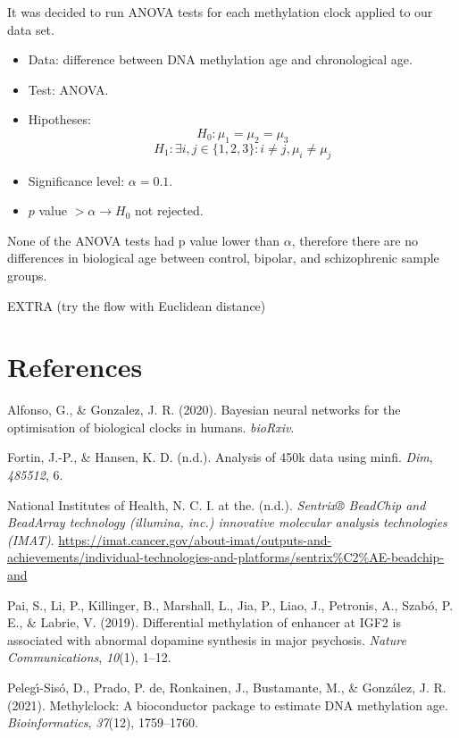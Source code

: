 \documentclass[
]{article}
\newlength{\cslhangindent}
\newlength{\cslentryspacingunit} %
\newenvironment{CSLReferences}[2] %
 {%
  \setlength{\parindent}{0pt}
  \ifodd #1
  \let\oldpar\par
  \def\par{\hangindent=\cslhangindent\oldpar}
  \fi
  \setlength{\parskip}{#2\cslentryspacingunit}
 }%
 {}
\begin{document}
It was decided to run ANOVA tests for each methylation clock applied to
our data set.

\begin{itemize}
\item
  Data: difference between DNA methylation age and chronological age.
\item
  Test: ANOVA.
\item
  Hipotheses: \[H_0: \mu_1=\mu_2=\mu_3\]
  \[H_1: \exists i,j\in\{1,2,3\}: i\neq j, \mu_i \neq \mu_j\]
\item
  Significance level: \(\alpha=0.1\).
\item
  \(p\) value \(> \alpha \rightarrow H_0\) not rejected.
\end{itemize}

None of the ANOVA tests had p value lower than \(\alpha\), therefore
there are no differences in biological age between control, bipolar, and
schizophrenic sample groups.

EXTRA (try the flow with Euclidean distance)

\hypertarget{references}{%
\section*{References}\label{references}}

\hypertarget{refs}{}
\begin{CSLReferences}{1}{0}
\leavevmode{}%
Alfonso, G., \& Gonzalez, J. R. (2020). Bayesian neural networks for the
optimisation of biological clocks in humans. \emph{bioRxiv}.

\leavevmode{}%
Fortin, J.-P., \& Hansen, K. D. (n.d.). Analysis of 450k data using
minfi. \emph{Dim}, \emph{485512}, 6.

\leavevmode{}%
National Institutes of Health, N. C. I. at the. (n.d.). \emph{Sentrix®
BeadChip and BeadArray technology (illumina, inc.) \textbar{} innovative
molecular analysis technologies (IMAT)}.
\url{https://imat.cancer.gov/about-imat/outputs-and-achievements/individual-technologies-and-platforms/sentrix\%C2\%AE-beadchip-and}

\leavevmode{}%
Pai, S., Li, P., Killinger, B., Marshall, L., Jia, P., Liao, J.,
Petronis, A., Szabó, P. E., \& Labrie, V. (2019). Differential
methylation of enhancer at IGF2 is associated with abnormal dopamine
synthesis in major psychosis. \emph{Nature Communications},
\emph{10}(1), 1--12.

\leavevmode{}%
Pelegı́-Sisó, D., Prado, P. de, Ronkainen, J., Bustamante, M., \&
González, J. R. (2021). Methylclock: A bioconductor package to estimate
DNA methylation age. \emph{Bioinformatics}, \emph{37}(12), 1759--1760.

\end{CSLReferences}
\end{document}
